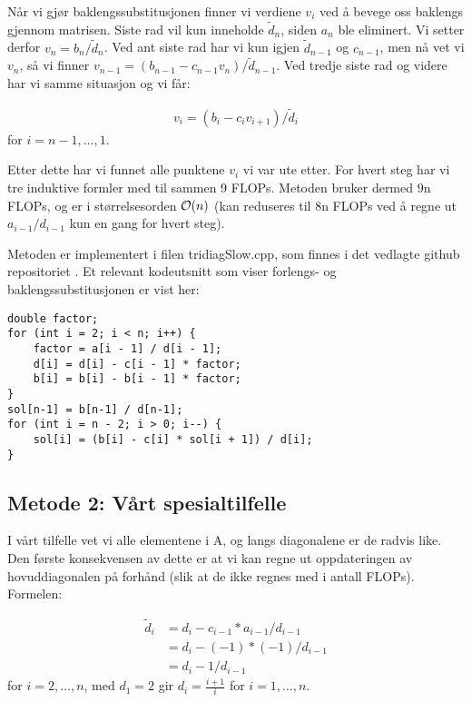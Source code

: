 \documentclass[reprint,english,notitlepage]{revtex4-1}
\begin{document}
	Når vi gjør baklengssubstitusjonen finner vi verdiene $v_i$ ved å bevege oss baklengs gjennom matrisen. Siste rad vil kun inneholde $\tilde{d}_n$, siden $a_n$ ble eliminert. Vi setter derfor $v_n = b_n / \tilde{d}_n$. Ved ant siste rad har vi kun igjen $\tilde{d}_{n-1}$ og $c_{n-1}$, men nå vet vi $v_n$, så vi finner $v_{n-1} = (b_{n-1} - c_{n-1}v_{n}) / \tilde{d}_{n-1}$. Ved tredje siste rad og videre har vi samme situasjon og vi får:
	
	\begin{equation*}
	\begin{aligned}
	v_{i} = (b_{i} - c_{i}v_{i+1}) / \tilde{d}_{i}
	\end{aligned}
	\end{equation*}
	for $i=n-1,\dots, 1$.
	
	Etter dette har vi funnet alle punktene $v_i$ vi var ute etter. For hvert steg har vi tre induktive formler med til sammen 9 FLOPs. Metoden bruker dermed 9n FLOPs, og er i størrelsesorden $\order{n}$ (kan reduseres til 8n FLOPs ved å regne ut $a_{i-1}/d_{i-1}$ kun en gang for hvert steg).
	
	Metoden er implementert i filen tridiagSlow.cpp, som finnes i det vedlagte github repositoriet \cite{myRepo}. Et relevant kodeutsnitt som viser forlengs- og baklengssubstitusjonen er vist her:
	
	\begin{verbatim}
double factor;
for (int i = 2; i < n; i++) {
    factor = a[i - 1] / d[i - 1];
    d[i] = d[i] - c[i - 1] * factor;
    b[i] = b[i] - b[i - 1] * factor;
}
sol[n-1] = b[n-1] / d[n-1];
for (int i = n - 2; i > 0; i--) {
    sol[i] = (b[i] - c[i] * sol[i + 1]) / d[i];
}
	\end{verbatim}

\subsection{Metode 2: Vårt spesialtilfelle}

	I vårt tilfelle vet vi alle elementene i A, og langs diagonalene er de radvis like. Den første konsekvensen av dette er at vi kan regne ut oppdateringen av hovuddiagonalen på forhånd (slik at de ikke regnes med i antall FLOPs). Formelen:
	
	\begin{equation*}
	\begin{aligned}
	\tilde{d}_i &= d_i - c_{i-1} * a_{i-1}/d_{i-1} \\
	&= d_i - (-1) * (-1)/d_{i-1} \\
	&= d_i - 1/d_{i-1}
	\end{aligned}
	\end{equation*}
	for $i=2,\dots, n$, med $d_1 = 2$ gir $d_i = \frac{i + 1}{i}$ for $i=1,\dots, n$.
	
\end{document}
